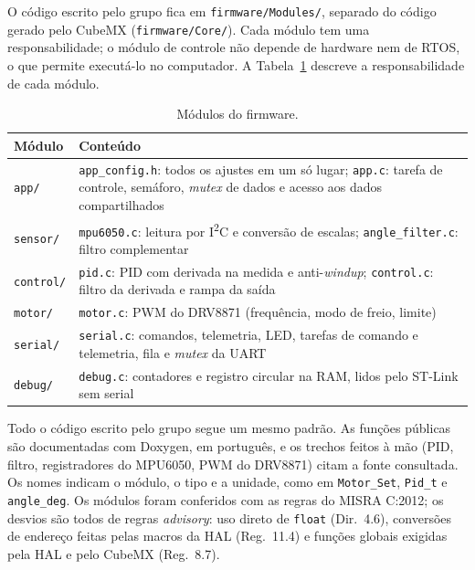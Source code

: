 O código escrito pelo grupo fica em \texttt{firmware/Modules/}, separado do código gerado pelo CubeMX (\texttt{firmware/Core/}). Cada módulo tem uma responsabilidade; o módulo de controle não depende de hardware nem de RTOS, o que permite executá-lo no computador. A Tabela~\ref{tab:modulos} descreve a responsabilidade de cada módulo.
\begin{table}[H]
\centering\caption{Módulos do firmware.}\label{tab:modulos}
\begin{tabularx}{\textwidth}{lX}
\hline\textbf{Módulo} & \textbf{Conteúdo}\\\hline
\texttt{app/} & \texttt{app\_config.h}: todos os ajustes em um só lugar; \texttt{app.c}: tarefa de controle, semáforo, \textit{mutex} de dados e acesso aos dados compartilhados\\
\texttt{sensor/} & \texttt{mpu6050.c}: leitura por I\textsuperscript{2}C e conversão de escalas; \texttt{angle\_filter.c}: filtro complementar\\
\texttt{control/} & \texttt{pid.c}: PID com derivada na medida e anti-\textit{windup}; \texttt{control.c}: filtro da derivada e rampa da saída\\
\texttt{motor/} & \texttt{motor.c}: PWM do DRV8871 (frequência, modo de freio, limite)\\
\texttt{serial/} & \texttt{serial.c}: comandos, telemetria, LED, tarefas de comando e telemetria, fila e \textit{mutex} da UART\\
\texttt{debug/} & \texttt{debug.c}: contadores e registro circular na RAM, lidos pelo ST-Link sem serial\\\hline
\end{tabularx}
\end{table}

Todo o código escrito pelo grupo segue um mesmo padrão. As funções públicas são documentadas com Doxygen, em português, e os trechos feitos à mão (PID, filtro, registradores do MPU6050, PWM do DRV8871) citam a fonte consultada. Os nomes indicam o módulo, o tipo e a unidade, como em \texttt{Motor\_Set}, \texttt{Pid\_t} e \texttt{angle\_deg}. Os módulos foram conferidos com as regras do MISRA C:2012; os desvios são todos de regras \textit{advisory}: uso direto de \texttt{float} (Dir.~4.6), conversões de endereço feitas pelas macros da HAL (Reg.~11.4) e funções globais exigidas pela HAL e pelo CubeMX (Reg.~8.7).

